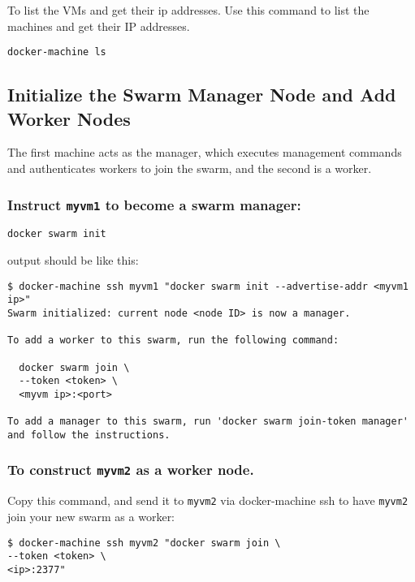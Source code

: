 To list the VMs and get their ip addresses. Use this command to list the
machines and get their IP addresses.

\begin{lstlisting}
docker-machine ls
\end{lstlisting}

\subsection{Initialize the Swarm Manager Node and Add Worker Nodes}

The first machine acts as the manager, which executes management
commands and authenticates workers to join the swarm, and the second is
a worker.

\subsubsection{\texorpdfstring{Instruct \texttt{myvm1} to become a swarm manager:}{Instruct myvm1 to become a swarm manager:}}

\begin{lstlisting}
docker swarm init
\end{lstlisting}

output should be like this:

\begin{lstlisting}
$ docker-machine ssh myvm1 "docker swarm init --advertise-addr <myvm1 ip>"
Swarm initialized: current node <node ID> is now a manager.

To add a worker to this swarm, run the following command:

  docker swarm join \
  --token <token> \
  <myvm ip>:<port>

To add a manager to this swarm, run 'docker swarm join-token manager' and follow the instructions.
\end{lstlisting}

\subsubsection{\texorpdfstring{To construct \texttt{myvm2} as a worker node.}{To construct myvm2 as a worker node.}}

Copy this command, and send it to \texttt{myvm2} via docker-machine ssh
to have \texttt{myvm2} join your new swarm as a worker:

\begin{lstlisting}
$ docker-machine ssh myvm2 "docker swarm join \
--token <token> \
<ip>:2377"
\end{lstlisting}

